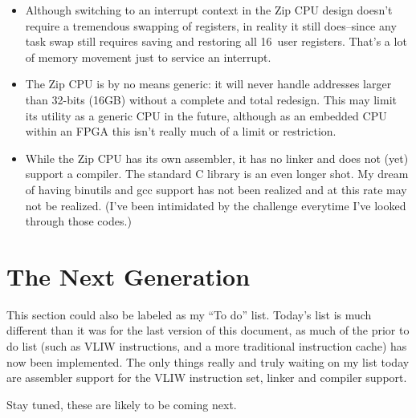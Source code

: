 \documentclass{gqtekspec}
\begin{document}
\begin{itemize}
\item Although switching to an interrupt context in the Zip CPU design doesn't
	require a tremendous swapping of registers, in reality it still
	does--since any task swap still requires saving and restoring all
	16~user registers. That's a lot of memory movement just to service
	an interrupt.

\item The Zip CPU is by no means generic: it will never handle addresses
	larger than 32-bits (16GB) without a complete and total redesign.
	This may limit its utility as a generic CPU in the future, although
	as an embedded CPU within an FPGA this isn't really much of a limit
	or restriction.

\item While the Zip CPU has its own assembler, it has no linker and does not
	(yet) support a compiler. The standard C library is an even longer
	shot. My dream of having binutils and gcc support has not been
	realized and at this rate may not be realized. (I've been intimidated
	by the challenge everytime I've looked through those codes.)
\end{itemize}

\section{The Next Generation}
This section could also be labeled as my ``To do'' list.  Today's list is
much different than it was for the last version of this document, as much of
the prior to do list (such as VLIW instructions, and a more traditional
instruction cache) has now been implemented.  The only things really and
truly waiting on my list today are assembler support for the VLIW instruction
set, linker and compiler support.

Stay tuned, these are likely to be coming next.

\end{document}
